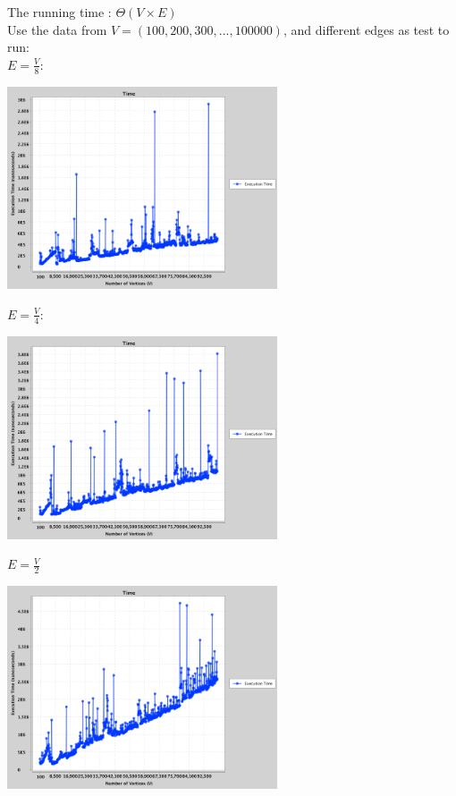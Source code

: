 \documentclass{article}
\begin{document}
\begin{enumerate}
    The running time : $\Theta(V \times E)$\\
    Use the data from $V = (100, 200, 300, ... , 100000)$, and different edges as test to run:\\
    $E = \frac{V}{8}$: 
                    \begin{center}
        \includegraphics[width=0.6\textwidth]{un18.png}
        \end{center}
    $E = \frac{V}{4}$: 
                    \begin{center}
        \includegraphics[width=0.6\textwidth]{un14.png}
        \end{center}
    $E = \frac{V}{2}$
                \begin{center}
        \includegraphics[width=0.6\textwidth]{uniformtime.png}
        \end{center}

\end{enumerate}
\end{document}

